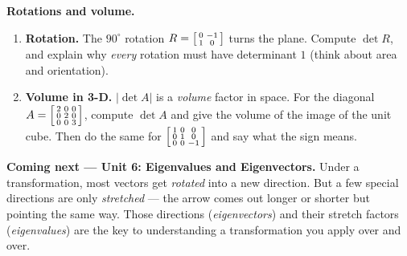 \documentclass[10pt]{article}
\begin{document}
\begin{extensionbox}
\textbf{Rotations and volume.}
\begin{enumerate}[label=(\alph*), leftmargin=1.8em, itemsep=5pt]
  \item \textbf{Rotation.} The $90^\circ$ rotation $R=\begin{bsmallmatrix} 0 & -1 \\ 1 & 0 \end{bsmallmatrix}$
        turns the plane. Compute $\det R$, and explain why \emph{every} rotation must have determinant $1$
        (think about area and orientation).
  \item \textbf{Volume in 3-D.} $|\det A|$ is a \emph{volume} factor in space. For the diagonal
        $A=\begin{bsmallmatrix} 2 & 0 & 0 \\ 0 & 2 & 0 \\ 0 & 0 & 3 \end{bsmallmatrix}$, compute $\det A$
        and give the volume of the image of the unit cube. Then do the same for
        $\begin{bsmallmatrix} 1 & 0 & 0 \\ 0 & 1 & 0 \\ 0 & 0 & -1 \end{bsmallmatrix}$ and say what the sign means.
\end{enumerate}
\end{extensionbox}

\begin{spiralbox}
\textbf{Coming next --- Unit 6: Eigenvalues and Eigenvectors.} Under a transformation, most vectors get
\emph{rotated} into a new direction. But a few special directions are only \emph{stretched} --- the arrow
comes out longer or shorter but pointing the same way. Those directions (\emph{eigenvectors}) and their
stretch factors (\emph{eigenvalues}) are the key to understanding a transformation you apply over and over.
\end{spiralbox}
\end{document}
